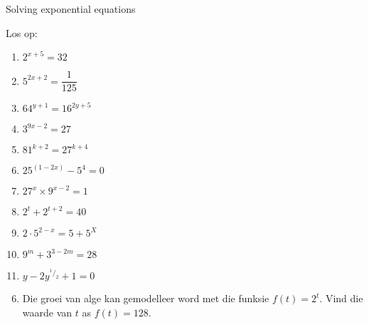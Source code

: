 \begin{exercises}{Solving exponential equations}
{
Los op:
\begin{multicols}{2}
\begin{enumerate}[noitemsep, label=\textbf{\arabic*}., itemsep=5pt]
\item $ 2^{x+5} = 32 $
\item $ 5^{2x+2} = \dfrac{1}{125} $
\item $ 64^{y+1} = 16^{2y+5} $
\item $ 3^{9x-2} = 27 $
\item $ 81^{k+2} = 27^{k+4} $
\setcounter{enumi}{6}
\item $ 25^{(1-2x)}-5^4 = 0 $
\item $ 27^x \times 9^{x-2} = 1 $
\item $ 2^t + 2^{t+2} = 40 $
\item $ 2 \cdot 5^{2-x} = 5+ 5^X $
\item $ 9^m + 3^{3-2m} = 28 $
\item $ y - 2y^{^1/_2} + 1 = 0 $
\end{enumerate}
\end{multicols}

\begin{enumerate}[noitemsep, label=\textbf{\arabic*}., itemsep=5pt]
\setcounter{enumi}{5}
 \item Die groei van alge kan gemodelleer word met die funksie $f(t) = 2^t$. Vind die waarde van $t$ as $f(t)=128$.   
\end{enumerate}

}
\end{exercises}








